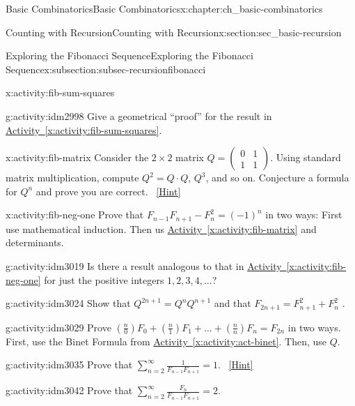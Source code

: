 \documentclass[oneside,10pt,]{book}
\numberwithin{equation}{chapter}
\newcommand{\amp}{&}
\begin{document}
\begin{chapterptx}{Basic Combinatorics}{}{Basic Combinatorics}{}{}{x:chapter:ch_basic-combinatorics}
\begin{sectionptx}{Counting with Recursion}{}{Counting with Recursion}{}{}{x:section:sec_basic-recursion}
\begin{subsectionptx}{Exploring the Fibonacci Sequence}{}{Exploring the Fibonacci Sequence}{}{}{x:subsection:subsec-recursionfibonacci}
\begin{activity}{}{x:activity:fib-sum-squares}
\end{activity}
\begin{activity}{}{g:activity:idm2998}%
Give a geometrical ``proof'' for the result in \hyperref[x:activity:fib-sum-squares]{Activity~\ref{x:activity:fib-sum-squares}}.%
\end{activity}
\begin{activity}{}{x:activity:fib-matrix}%
Consider the \(2\times 2\) matrix \(Q =
\begin{pmatrix}
0 \amp 1\\
1 \amp 1
\end{pmatrix}.\) Using standard matrix multiplication, compute \(Q^2 = Q\cdot Q\), \(Q^3\), and so on.  Conjecture a formula for \(Q^n\) and prove you are correct.%
\qquad~\hfill{\tiny\hyperlink{g:hint:idm3011-back}{[Hint]}}\end{activity}
\begin{activity}{}{x:activity:fib-neg-one}%
Prove that \(F_{n - 1}F_{n + 1} - F_{n}^{2} = (-1)^{n}\) in two ways:  First use mathematical induction.  Then us \hyperref[x:activity:fib-matrix]{Activity~\ref{x:activity:fib-matrix}} and determinants.%
\end{activity}
\begin{activity}{}{g:activity:idm3019}%
Is there a result analogous to that in \hyperref[x:activity:fib-neg-one]{Activity~\ref{x:activity:fib-neg-one}} for just the positive integers \(1, 2, 3, 4, \ldots\)?%
\end{activity}
\begin{activity}{}{g:activity:idm3024}%
Show that \(Q^{2n + 1} = Q^{n}Q^{n+1}\) and that \(F_{2n + 1} = F_{n + 1}^{2} + F_{n}^{2}\) .%
\end{activity}
\begin{activity}{}{g:activity:idm3029}%
Prove \(\left( \frac{n}{0} \right)F_{0} + \left( \frac{n}{1} \right)F_{1} + \ldots + \left( \frac{n}{n} \right)F_{n} = F_{2n}\) in two ways.  First, use the Binet Formula from \hyperref[x:activity:act-binet]{Activity~\ref{x:activity:act-binet}}.  Then, use \(Q\).%
\end{activity}
\begin{activity}{}{g:activity:idm3035}%
Prove that \(\sum_{n = 2}^{\infty}\frac{1}{F_{n - 1}F_{n + 1}} = 1\).%
\qquad~\hfill{\tiny\hyperlink{g:hint:idm3039-back}{[Hint]}}\end{activity}
\begin{activity}{}{g:activity:idm3042}%
Prove that \(\sum_{n = 2}^{\infty}\frac{F_{n}}{F_{n - 1}F_{n + 1}} = 2.\)%
\end{activity}

\end{subsectionptx}
\end{sectionptx}
\end{chapterptx}
\end{document}
